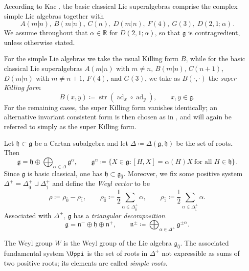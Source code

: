 \documentclass[11pt]{amsart}
\newcommand{\str}{\operatorname{str}}
\newcommand{\ad}{\operatorname{ad}}
\def\RR{{\mathbb R}}
\def\hh{{\mathfrak h}}
\def\even{{\mathfrak{g}_{\bar{0}}}}
\def\nn {{\mathfrak{n}}}
\def\gg{{\mathfrak{g}}}
\theoremstyle{plain}
\theoremstyle{remark}
\theoremstyle{definition}
\numberwithin{equation}{section}
\theoremstyle{remark}
\begin{document}
According to Kac \cite{Kac}, the basic classical Lie superalgebras comprise the complex simple Lie algebras together with
\begin{equation}
A(m\vert n),\ B(m\vert n),\ C(n),\ D(m\vert n),\ F(4),\ G(3),\ D(2,1;\alpha).
\end{equation}
We assume throughout that $\alpha\in\RR$ for $D(2,1;\alpha)$, so that $\gg$ is contragredient, unless otherwise stated. 

For the simple Lie algebras we take the usual Killing form $B$, while for the basic classical Lie superalgebras $A(m\vert n)$ with $m\neq n$, $B(m\vert n)$, $C(n+1)$, $D(m\vert n)$ with $m\neq n+1$, $F(4)$, and $G(3)$, we take as $B(\cdot,\cdot)$ the \emph{super Killing form}
\begin{equation}
B(x,y)\coloneqq \str(\ad_x\circ\ad_y),\qquad x,y\in\gg.
\end{equation}
For the remaining cases, the super Killing form vanishes identically; an alternative invariant consistent form is then chosen as in \cite[Section~5.4]{Musson}, and will again be referred to simply as the super Killing form.

Let $\hh\subset\gg$ be a Cartan subalgebra and let $\Delta\coloneqq \Delta(\gg,\hh)$ be the set of roots. Then
\begin{equation}
\gg=\hh\oplus\bigoplus_{\alpha\in\Delta}\gg^\alpha,
\qquad
\gg^\alpha\coloneqq \{X\in\gg:[H,X]=\alpha(H)X\ \text{for all }H\in\hh\}.
\end{equation}
Since $\gg$ is basic classical, one has $\hh\subset\even$. Moreover, we fix some positive system $\Delta^{+}=\Delta_{\bar{0}}^{+} \sqcup \Delta_{\bar{1}}^{+}$ and define the \emph{Weyl vector} to be 
\begin{equation}
\rho\coloneqq \rho_{\bar{0}}-\rho_{\bar{1}}, \qquad \rho_{\bar{0}}\coloneqq \frac{1}{2}\sum_{\alpha \in \Delta^{+}_{\bar{0}}}\alpha, \qquad \rho_{\bar{1}}\coloneqq \frac{1}{2}\sum_{\alpha \in \Delta^{+}_{\bar{1}}}\alpha.
\end{equation}
Associated with $\Delta^{+}$, $\gg$ has a \emph{triangular decomposition}
\begin{equation}
 \gg=\nn^{-} \oplus \hh \oplus \nn^{+}, \qquad \nn^{\pm}\coloneqq \bigoplus_{\alpha \in \Delta^{+}}\gg^{\pm \alpha}.
\end{equation}

The Weyl group $W$ is the Weyl group of the Lie algebra $\even$. The associated fundamental system $\Uppi$ is the set of roots in $\Delta^+$ not expressible as sums of two positive roots; its elements are called \emph{simple roots}.
\end{document}
